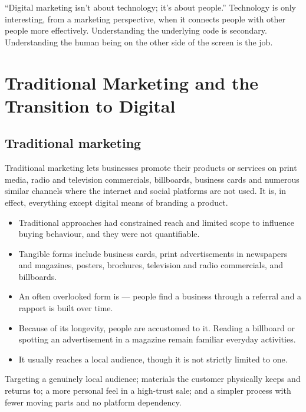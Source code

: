 \documentclass{MMTextbook}
\begin{document}
\begin{keybox}
``Digital marketing isn't about technology; it's about people.'' Technology is
only interesting, from a marketing perspective, when it connects people with
other people more effectively. Understanding the underlying code is secondary.
Understanding the human being on the other side of the screen is the job.
\end{keybox}

\section{Traditional Marketing and the Transition to Digital}

\subsection{Traditional marketing}

Traditional marketing lets businesses promote their products or services on
print media, radio and television commercials, billboards, business cards and
numerous similar channels where the internet and social platforms are not used.
It is, in effect, everything except digital means of branding a product.

\begin{itemize}
\item Traditional approaches had constrained reach and limited scope to
      influence buying behaviour, and they were not quantifiable.
\item Tangible forms include business cards, print advertisements in newspapers
      and magazines, posters, brochures, television and radio commercials, and
      billboards.
\item An often overlooked form is  --- people find
      a business through a referral and a rapport is built over time.
\item Because of its longevity, people are accustomed to it. Reading a
      billboard or spotting an advertisement in a magazine remain familiar
      everyday activities.
\item It usually reaches a local audience, though it is not strictly limited to
      one.
\end{itemize}

\begin{examplebox}
Targeting a genuinely local audience; materials the customer physically keeps
and returns to; a more personal feel in a high-trust sale; and a simpler
process with fewer moving parts and no platform dependency.
\end{examplebox}
\end{document}
